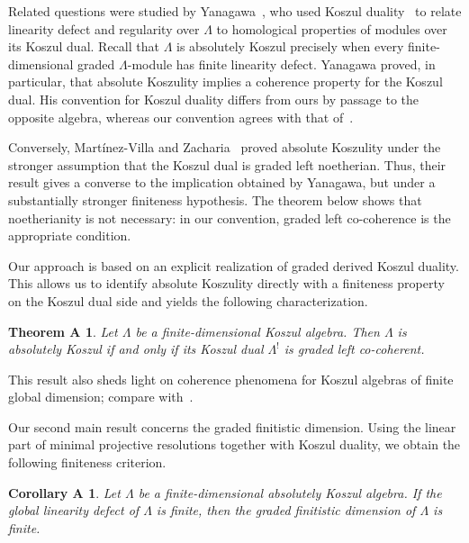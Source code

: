 \documentclass[11pt]{article}
\newtheorem*{theoremA}{\textbf{Theorem A}}
\newtheorem*{corollaryA}{\textbf{Corollary A}}
\theoremstyle{definition}
\theoremstyle{remark}
\begin{document}
\medskip

Related questions were studied by Yanagawa~\cite{26,27}, who used Koszul duality~\cite{3} to relate linearity defect and regularity over \(\Lambda\) to homological properties of modules over its Koszul dual. Recall that \(\Lambda\) is absolutely Koszul precisely when every finite-dimensional graded \(\Lambda\)-module has finite linearity defect. Yanagawa proved, in particular, that absolute Koszulity implies a coherence property for the Koszul dual. His convention for Koszul duality differs from ours by passage to the opposite algebra, whereas our convention agrees with that of~\cite{3}.

Conversely, Mart\'inez-Villa and Zacharia~\cite{19} proved absolute Koszulity under the stronger assumption that the Koszul dual is graded left noetherian. Thus, their result gives a converse to the implication obtained by Yanagawa, but under a substantially stronger finiteness hypothesis. The theorem below shows that noetherianity is not necessary: in our convention, graded left co-coherence is the appropriate condition.

Our approach is based on an explicit realization of graded derived Koszul duality. This allows us to identify absolute Koszulity directly with a finiteness property on the Koszul dual side and yields the following characterization.

\begin{theoremA}
Let \(\Lambda\) be a finite-dimensional Koszul algebra. Then \(\Lambda\) is absolutely Koszul if and only if its Koszul dual \(\Lambda^{!}\) is graded left co-coherent.
\end{theoremA}

\medskip

This result also sheds light on coherence phenomena for Koszul algebras of finite global dimension; compare with~\cite[Conjecture~1.3]{22}.

\medskip

Our second main result concerns the graded finitistic dimension. Using the linear part of minimal projective resolutions together with Koszul duality, we obtain the following finiteness criterion.

\begin{corollaryA}
Let \(\Lambda\) be a finite-dimensional absolutely Koszul algebra. If the global linearity defect of \(\Lambda\) is finite, then the graded finitistic dimension of \(\Lambda\) is finite.
\end{corollaryA}
\end{document}
